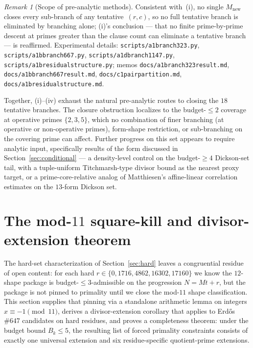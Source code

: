 \documentclass[11pt]{article}
\renewcommand{\_}{\origunderscore\allowbreak}
\theoremstyle{definition}
\theoremstyle{remark}
\newtheorem{remark}[theorem]{Remark}
\begin{document}
\begin{remark}[Scope of pre-analytic methods]
Consistent with~(i), no single $M_\mathrm{new}$ closes every
sub-branch of any tentative~$(r,c)$, so no full tentative branch is
eliminated by branching alone; (i)'s conclusion — that no finite
prime-by-prime descent at primes greater than the clause count can
eliminate a tentative branch — is reaffirmed. Experimental details:
\texttt{scripts/a1\_branch\_323.py},
\texttt{scripts/a1b\_branch\_667.py},
\texttt{scripts/a1d\_branch\_1147.py},
\texttt{scripts/a1b\_residual\_structure.py};
memos \texttt{docs/a1\_branch323\_result.md},
\texttt{docs/a1b\_branch667\_result.md},
\texttt{docs/c1\_pair\_partition.md},
\texttt{docs/a1b\_residual\_structure.md}.

Together, (i)–(iv) exhaust the natural pre-analytic routes to
closing the $18$ tentative branches. The closure obstruction
localizes to the budget-$\le 2$ coverage at operative primes
$\{2, 3, 5\}$, which no combination of finer branching (at operative
or non-operative primes), form-shape restriction, or sub-branching
on the covering prime can affect.
Further progress on this set appears to require analytic input,
specifically results of the form discussed in
Section~\ref{sec:conditional} — a density-level control on the
budget-$\ge 4$ Dickson-set tail, with a tuple-uniform
Titchmarsh-type divisor bound as the nearest proxy target, or a
prime-core-relative analog of Matthiesen's affine-linear
correlation estimates on the $13$-form Dickson set.
\end{remark}

\section{The mod-$11$ square-kill and divisor-extension theorem}\label{sec:div_ext}

The hard-set characterization of Section~\ref{sec:hard} leaves a
congruential residue of open content: for each hard
$r\in\{0,1716,4862,16302,17160\}$ we know the $12$-shape package is
budget-$\le 3$-admissible on the progression $N=Mt+r$, but the package
is not pinned to primality until we close the mod-$11$ shape
classification. This section supplies that pinning via a standalone
arithmetic lemma on integers $x\equiv -1\pmod{11}$, derives a
divisor-extension corollary that applies to Erd\H{o}s $\#647$
candidates on hard residues, and proves a completeness theorem:
under the budget bound $B_k\le 5$, the resulting list of forced
primality constraints consists of exactly one universal extension
and six residue-specific quotient-prime extensions.
\end{document}
